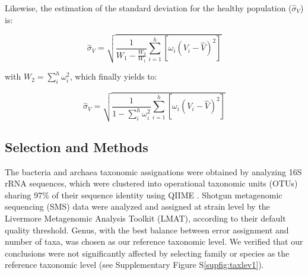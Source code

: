 Likewise, the estimation of the standard deviation for the healthy population ($\widehat{\sigma}_V$) is:
\begin{linenomath}
$$\widehat{\sigma}_V = \sqrt{\frac{1}{W_1-\frac{W_2}{W_1}}\sum_{i=1}^h\left[\omega_i\left(V_i-\hat{V}\right)^2\right]}$$
\end{linenomath}
with $W_2=\sum_i^h \omega_i^2$, which finally yields to:
\begin{linenomath}
$$\widehat{\sigma}_V = \sqrt{\frac{1}{1-\sum_i^h \omega_i^2}\sum_{i=1}^h\left[\omega_i\left(V_i-\hat{V}\right)^2\right]}$$
\end{linenomath}

\subsection*{Selection and Methods}

The bacteria and archaea taxonomic assignations were obtained by analyzing 16S rRNA sequences, which were clustered into operational taxonomic units (OTUs) sharing 97\% of their sequence identity using QIIME \cite{QIIME}. Shotgun metagenomic sequencing (SMS) data\cite{kwashiorkor} were analyzed and assigned at strain level by the Livermore Metagenomic Analysis Toolkit (LMAT)\cite{LMAT}, according to their default quality threshold. Genus, with the best balance between error assignment and number of taxa, was chosen as our reference taxonomic level. We verified that our conclusions were not significantly affected by selecting family or species as the reference taxonomic level (see Supplementary Figure S\ref{supfig:taxlev1}).

